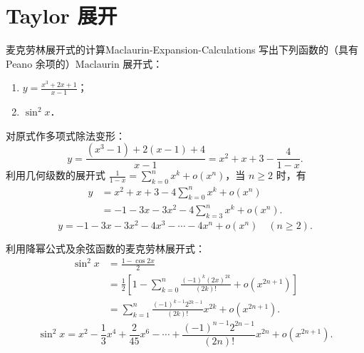 \section{Taylor 展开}

\begin{problem}{麦克劳林展开式的计算}{Maclaurin-Expansion-Calculations}
    写出下列函数的（具有 Peano 余项的）Maclaurin 展开式：
    \begin{enumerate}
        \item $y = \frac{x^3 + 2x + 1}{x - 1}$；
        \item $\sin^2 x$．
    \end{enumerate}
\end{problem}

\begin{solution}

    对原式作多项式除法变形：
    \begin{equation}
        y = \frac{(x^3 - 1) + 2(x - 1) + 4}{x - 1} = x^2 + x + 3 - \frac{4}{1 - x}.
    \end{equation}
    利用几何级数的展开式 $\frac{1}{1 - x} = \sum_{k=0}^n x^k + o(x^n)$，当 $n \geqslant 2$ 时，有
    \begin{equation}
        \begin{aligned}
            y & = x^2 + x + 3 - 4 \sum_{k=0}^n x^k + o(x^n)    \\
              & = -1 - 3x - 3x^2 - 4\sum_{k=3}^n x^k + o(x^n).
        \end{aligned}
    \end{equation}
    \begin{equation}
        \boxed{y = -1 - 3x - 3x^2 - 4x^3 - \cdots - 4x^n + o(x^n) \quad (n \geqslant 2).}
    \end{equation}


    利用降幂公式及余弦函数的麦克劳林展开式：
    \begin{equation}
        \begin{aligned}
            \sin^2 x & = \frac{1 - \cos 2x}{2}                                                                    \\
                     & = \frac{1}{2} \left[ 1 - \sum_{k=0}^n \frac{(-1)^k (2x)^{2k}}{(2k)!} + o(x^{2n+1}) \right] \\
                     & = \sum_{k=1}^n \frac{(-1)^{k-1} 2^{2k-1}}{(2k)!} x^{2k} + o(x^{2n+1}).
        \end{aligned}
    \end{equation}
    \begin{equation}
        \boxed{\sin^2 x = x^2 - \frac{1}{3}x^4 + \frac{2}{45}x^6 - \cdots + \frac{(-1)^{n-1} 2^{2n-1}}{(2n)!} x^{2n} + o(x^{2n+1}).}
    \end{equation}
\end{solution}

